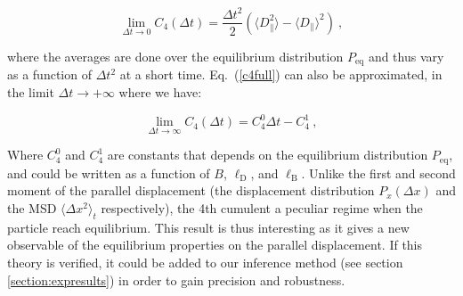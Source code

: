 \begin{equation}
	\lim\limits_{\Delta t \rightarrow 0 } C_4 (\Delta t) = \frac{\Delta t ^2}{2}
	\left(
	\langle D_\parallel ^2 \rangle - \langle D _\parallel \rangle ^2 
	\right)~,
\end{equation}

where the averages are done over the equilibrium distribution $P_\mathrm{eq}$ and thus vary as a function of $\Delta t ^2$ at a short time. Eq.~(\ref{c4full}) can also be approximated, in the limit $\Delta t \rightarrow + \infty$ where we have:

\begin{equation}
	\lim\limits_{\Delta t \rightarrow \infty } C_4 (\Delta t) = C_4 ^0 \Delta t - C^1 _4 ~,
\end{equation}

Where $ C_4 ^0$ and $ C_4 ^1$ are constants that depends on the equilibrium distribution $P_\mathrm{eq}$, and could be written as a function of $B$, $\ell _ \mathrm{D}$, and $\ell _\mathrm{B}$. Unlike the first and second moment of the parallel displacement (the displacement distribution $P_x(\Delta x)$ and the \gls{MSD} $\langle \Delta x ^2 \rangle_t $ respectively), the 4th cumulent a peculiar regime when the particle reach equilibrium. This result is thus interesting as it gives a new observable of the equilibrium properties on the parallel displacement. If this theory is verified, it could be added to our inference method (see section \ref{section:expresults}) in order to gain precision and robustness.

